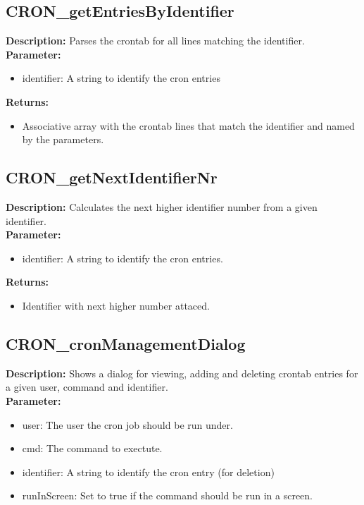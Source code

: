 \subsection{CRON\_getEntriesByIdentifier}
\textbf{Description:} Parses the crontab for all lines matching the identifier.\\
\textbf{Parameter:}
\begin{itemize}
\item identifier: A string to identify the cron entries
\end{itemize}
\textbf{Returns:}
\begin{itemize}
\item Associative array with the crontab lines that match the identifier and named by the parameters.
\end{itemize}

\subsection{CRON\_getNextIdentifierNr}
\textbf{Description:} Calculates the next higher identifier number from a given identifier.\\
\textbf{Parameter:}
\begin{itemize}
\item identifier: A string to identify the cron entries.
\end{itemize}
\textbf{Returns:}
\begin{itemize}
\item Identifier with next higher number attaced.
\end{itemize}

\subsection{CRON\_cronManagementDialog}
\textbf{Description:} Shows a dialog for viewing, adding and deleting crontab entries for a given user, command and identifier.\\
\textbf{Parameter:}
\begin{itemize}
\item user: The user the cron job should be run under.
\item cmd: The command to exectute.
\item identifier: A string to identify the cron entry (for deletion)
\item runInScreen: Set to true if the command should be run in a screen.
\end{itemize}

